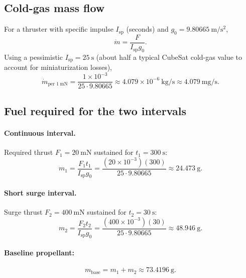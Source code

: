 \documentclass{article}
\begin{document}
\subsection*{Cold-gas mass flow}
For a thruster with specific impulse \(I_{\mathrm{sp}}\) (seconds) and \(g_0=\SI{9.80665}{\m\per\s^2}\),
\[
\dot m = \frac{F}{I_{\mathrm{sp}} g_0}.
\]
Using a pessimistic \(I_{\mathrm{sp}}=\SI{25}{\s}\) (about half a typical CubeSat cold-gas value to account for miniaturization losses),
\[
\dot m_{\text{per }1\ \mathrm{mN}} = \frac{1\times 10^{-3}}{25\cdot 9.80665}
\approx 4.079\times 10^{-6}\ \mathrm{kg/s} \approx 4.079\ \mathrm{mg/s}.
\]

\subsection*{Fuel required for the two intervals}
\paragraph{Continuous interval.}
Required thrust \(F_1=\SI{20}{\milli\newton}\) sustained for \(t_1=\SI{300}{\s}\):
\[
m_1 = \frac{F_1 t_1}{I_{\mathrm{sp}} g_0}
= \frac{(20\times 10^{-3})(300)}{25\cdot 9.80665}
\approx \SI{24.473}{\g}.
\]

\paragraph{Short surge interval.}
Surge thrust \(F_2=\SI{400}{\milli\newton}\) sustained for \(t_2=\SI{30}{\s}\):
\[
m_2 = \frac{F_2 t_2}{I_{\mathrm{sp}} g_0}
= \frac{(400\times 10^{-3})(30)}{25\cdot 9.80665}
\approx \SI{48.946}{\g}.
\]

\paragraph{Baseline propellant:}
\[
m_{\mathrm{base}} = m_1 + m_2 \approx \SI{73.4196}{\g}.
\]
\end{document}
